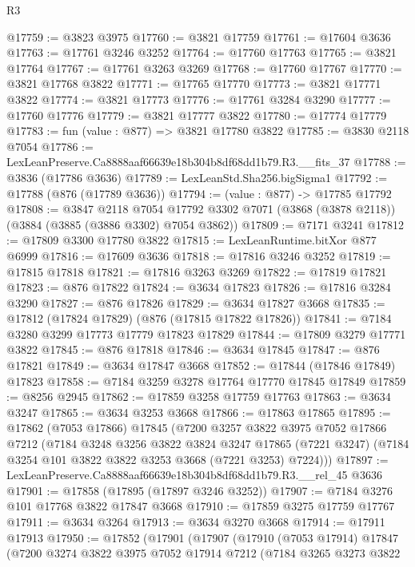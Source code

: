 \begin{lexlean}{R3}
\begin{coremodule}
@17759 := @3823 @3975
@17760 := @3821 @17759
@17761 := @17604 @3636
@17763 := @17761 @3246 @3252
@17764 := @17760 @17763
@17765 := @3821 @17764
@17767 := @17761 @3263 @3269
@17768 := @17760 @17767
@17770 := @3821 @17768 @3822
@17771 := @17765 @17770
@17773 := @3821 @17771 @3822
@17774 := @3821 @17773
@17776 := @17761 @3284 @3290
@17777 := @17760 @17776
@17779 := @3821 @17777 @3822
@17780 := @17774 @17779
@17783 := fun (value : @877) => @3821 @17780 @3822
@17785 := @3830 @2118 @7054
@17786 := LexLeanPreserve.Ca8888aaf66639e18b304b8df68dd1b79.R3.__fits_37
@17788 := @3836 (@17786 @3636)
@17789 := LexLeanStd.Sha256.bigSigma1
@17792 := @17788 (@876 (@17789 @3636))
@17794 := (value : @877) -> @17785 @17792
@17808 := @3847
    @2118
    @7054
    @17792
    @3302
    @7071
    (@3868 (@3878 @2118))
    (@3884 (@3885 (@3886 @3302) @7054 @3862))
@17809 := @7171 @3241
@17812 := @17809 @3300 @17780 @3822
@17815 := LexLeanRuntime.bitXor @877 @6999
@17816 := @17609 @3636
@17818 := @17816 @3246 @3252
@17819 := @17815 @17818
@17821 := @17816 @3263 @3269
@17822 := @17819 @17821
@17823 := @876 @17822
@17824 := @3634 @17823
@17826 := @17816 @3284 @3290
@17827 := @876 @17826
@17829 := @3634 @17827 @3668
@17835 := @17812 (@17824 @17829) (@876 (@17815 @17822 @17826))
@17841 := @7184 @3280 @3299 @17773 @17779 @17823 @17829
@17844 := @17809 @3279 @17771 @3822
@17845 := @876 @17818
@17846 := @3634 @17845
@17847 := @876 @17821
@17849 := @3634 @17847 @3668
@17852 := @17844 (@17846 @17849) @17823
@17858 := @7184 @3259 @3278 @17764 @17770 @17845 @17849
@17859 := @8256 @2945
@17862 := @17859 @3258 @17759 @17763
@17863 := @3634 @3247
@17865 := @3634 @3253 @3668
@17866 := @17863 @17865
@17895 := @17862
    (@7053 @17866)
    @17845
    (@7200
      @3257
      @3822
      @3975
      @7052
      @17866
      @7212
      (@7184
        @3248
        @3256
        @3822
        @3824
        @3247
        @17865
        (@7221 @3247)
        (@7184 @3254 @101 @3822 @3822 @3253 @3668 (@7221 @3253) @7224)))
@17897 := LexLeanPreserve.Ca8888aaf66639e18b304b8df68dd1b79.R3.__rel_45 @3636
@17901 := @17858 (@17895 (@17897 @3246 @3252))
@17907 := @7184 @3276 @101 @17768 @3822 @17847 @3668
@17910 := @17859 @3275 @17759 @17767
@17911 := @3634 @3264
@17913 := @3634 @3270 @3668
@17914 := @17911 @17913
@17950 := @17852
    (@17901
      (@17907
        (@17910
          (@7053 @17914)
          @17847
          (@7200
            @3274
            @3822
            @3975
            @7052
            @17914
            @7212
            (@7184
              @3265
              @3273
              @3822

\end{coremodule}
\end{lexlean}
